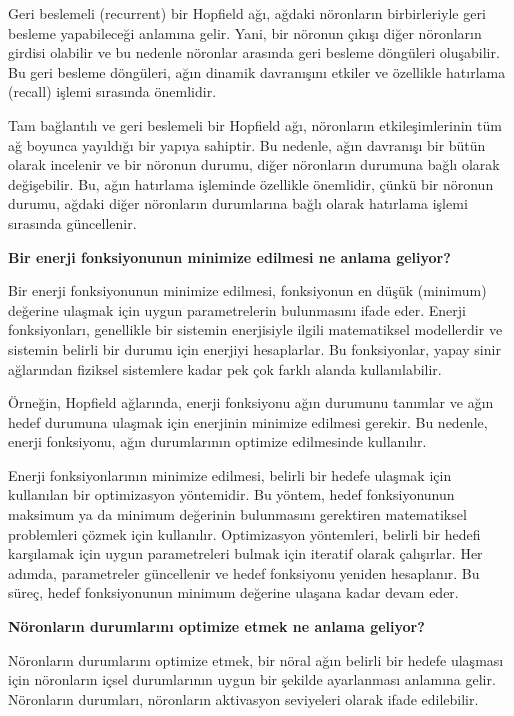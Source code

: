 \documentclass[11pt]{article}
\begin{document}
Geri beslemeli (recurrent) bir Hopfield ağı, ağdaki nöronların birbirleriyle geri besleme yapabileceği anlamına gelir. Yani, bir nöronun çıkışı diğer nöronların girdisi olabilir ve bu nedenle nöronlar arasında geri besleme döngüleri oluşabilir. Bu geri besleme döngüleri, ağın dinamik davranışını etkiler ve özellikle hatırlama (recall) işlemi sırasında önemlidir.

Tam bağlantılı ve geri beslemeli bir Hopfield ağı, nöronların etkileşimlerinin tüm ağ boyunca yayıldığı bir yapıya sahiptir. Bu nedenle, ağın davranışı bir bütün olarak incelenir ve bir nöronun durumu, diğer nöronların durumuna bağlı olarak değişebilir. Bu, ağın hatırlama işleminde özellikle önemlidir, çünkü bir nöronun durumu, ağdaki diğer nöronların durumlarına bağlı olarak hatırlama işlemi sırasında güncellenir.

 \textbf{Bir enerji fonksiyonunun minimize edilmesi ne anlama geliyor?}

 Bir enerji fonksiyonunun minimize edilmesi, fonksiyonun en düşük (minimum) değerine ulaşmak için uygun parametrelerin bulunmasını ifade eder. Enerji fonksiyonları, genellikle bir sistemin enerjisiyle ilgili matematiksel modellerdir ve sistemin belirli bir durumu için enerjiyi hesaplarlar. Bu fonksiyonlar, yapay sinir ağlarından fiziksel sistemlere kadar pek çok farklı alanda kullanılabilir.

Örneğin, Hopfield ağlarında, enerji fonksiyonu ağın durumunu tanımlar ve ağın hedef durumuna ulaşmak için enerjinin minimize edilmesi gerekir. Bu nedenle, enerji fonksiyonu, ağın durumlarının optimize edilmesinde kullanılır.

Enerji fonksiyonlarının minimize edilmesi, belirli bir hedefe ulaşmak için kullanılan bir optimizasyon yöntemidir. Bu yöntem, hedef fonksiyonunun maksimum ya da minimum değerinin bulunmasını gerektiren matematiksel problemleri çözmek için kullanılır. Optimizasyon yöntemleri, belirli bir hedefi karşılamak için uygun parametreleri bulmak için iteratif olarak çalışırlar. Her adımda, parametreler güncellenir ve hedef fonksiyonu yeniden hesaplanır. Bu süreç, hedef fonksiyonunun minimum değerine ulaşana kadar devam eder.

 \textbf{Nöronların durumlarını optimize etmek ne anlama geliyor? }

 Nöronların durumlarını optimize etmek, bir nöral ağın belirli bir hedefe ulaşması için nöronların içsel durumlarının uygun bir şekilde ayarlanması anlamına gelir. Nöronların durumları, nöronların aktivasyon seviyeleri olarak ifade edilebilir.
\end{document}
